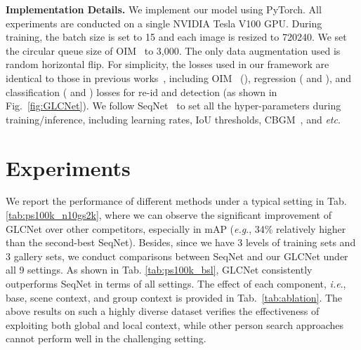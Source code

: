 \documentclass{article}
\def\eg{\emph{e.g}.} \def\Eg{\emph{E.g}.}
\def\ie{\emph{i.e}.} \def\Ie{\emph{I.e}.}
\def\etc{\emph{etc}.} \def\vs{\emph{vs}.}
\def\ourmodel{GLCNet}
\newcommand{\figref}[1]{Fig.~\ref{#1}}
\newcommand{\tabref}[1]{Tab.~\ref{#1}}
\begin{document}
\textbf{Implementation Details.} We implement our model using PyTorch. All experiments are conducted on a single NVIDIA Tesla V100 GPU. During training, the batch size is set to 15 and each image is resized to 720240. We set the circular queue size of OIM~\cite{OIM} to 3,000. The only data augmentation used is random horizontal flip. For simplicity, the losses used in our framework are identical to those in previous works~\cite{OIM,SeqNet,NAE}, including OIM~\cite{OIM} (), regression ( and ), and classification ( and ) losses for re-id and detection (as shown in \figref{fig:GLCNet}). We follow SeqNet~\cite{SeqNet} to set all the hyper-parameters during training/inference, including learning rates, IoU thresholds, CBGM~\cite{SeqNet}, and \etc{}




\section{Experiments}
\label{sec:exp}
We report the performance of different methods under a typical setting in Tab. \ref{tab:ps100k_n10gs2k}, where we can observe the significant improvement of \ourmodel{} over other competitors, especially in mAP (\eg, 34\% relatively higher than the second-best SeqNet). Besides, since we have 3 levels of training sets and 3 gallery sets, we conduct comparisons between SeqNet and our \ourmodel{} under all 9 settings. As shown in Tab. \ref{tab:ps100k_bsl}, \ourmodel{} consistently outperforms SeqNet in terms of all settings. The effect of each component, \ie{}, base, scene context, and group context is provided in \tabref{tab:ablation}.
The above results on such a highly diverse dataset verifies the effectiveness of exploiting both global and local context, while other person search approaches cannot perform well in the challenging setting.
\end{document}
